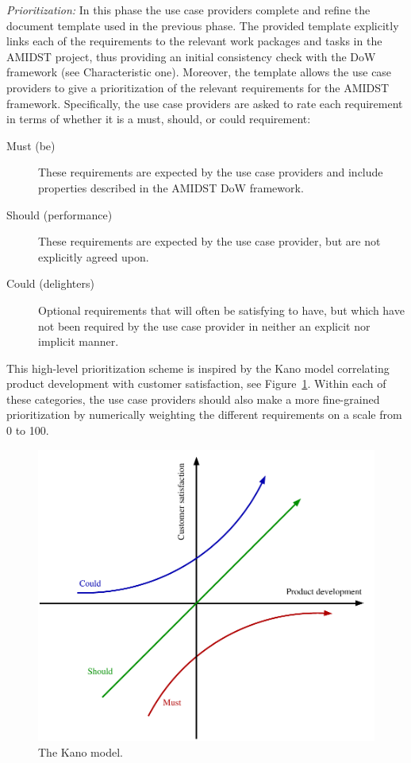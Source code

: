  \emph{Prioritization:} In this phase the use case providers complete and refine  the document template used in the
 previous phase. The provided template explicitly links each of the requirements to the relevant work packages and tasks in 
the
 AMIDST project, thus providing an initial consistency check with the DoW framework (see Characteristic one). Moreover, 
the template allows the use case providers to give
 a prioritization of the relevant requirements for the AMIDST framework.  Specifically, the use case
 providers are asked to rate each requirement in terms of whether it is a must, should, or could requirement:
\begin{description}
\item[Must (be)] These requirements are expected by the use case providers and include properties described in the 
AMIDST DoW framework.
\item[Should (performance)] These requirements are expected by the use case provider, but are not explicitly agreed upon.
\item[Could (delighters)] Optional requirements that will often be satisfying to have, but which have not been required
  by the use case provider in neither an explicit nor implicit manner.
\end{description}
 This high-level prioritization scheme is inspired by the Kano model
 correlating product development with customer satisfaction, see Figure~\ref{fig:kano}. Within each of these categories, the
 use case providers should also make a more fine-grained prioritization by numerically weighting the different
 requirements on a scale from 0 to 100. 

\begin{figure}[htbp]
  \centering
  \includegraphics[width=0.65\linewidth]{kano}
  \caption{The Kano model.}
  \label{fig:kano}
\end{figure}


